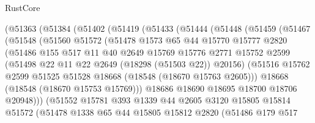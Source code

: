 \begin{lexlean}{RustCore}
\begin{coremodule}
          (@51363
            (@51384
              (@51402
                (@51419
                  (@51433
                    (@51444
                      (@51448
                        (@51459
                          (@51467
                            (@51548
                              (@51560
                                @51572
                                (@51478
                                  @1573
                                  @65
                                  @44
                                  @15770
                                  @15777
                                  @2820
                                  (@51486
                                    @155
                                    @517
                                    @11
                                    @40
                                    @2649
                                    @15769
                                    @15776
                                    @2771
                                    @15752
                                    @2599
                                    (@51498 @22 @11 @22 @2649 (@18298 (@51503 @22)) @20156)
                                    (@51516
                                      @15762
                                      @2599
                                      @51525
                                      @51528
                                      @18668
                                      (@18548 (@18670 @15763 @2605)))
                                    @18668
                                    (@18548 (@18670 @15753 @15769)))
                                  @18686
                                  @18690
                                  @18695
                                  @18700
                                  @18706
                                  @20948)))
                            (@51552
                              @15781
                              @393
                              @1339
                              @44
                              @2605
                              @3120
                              @15805
                              @15814
                              @51572
                              (@51478
                                @1338
                                @65
                                @44
                                @15805
                                @15812
                                @2820
                                (@51486
                                  @179
                                  @517

\end{coremodule}
\end{lexlean}
